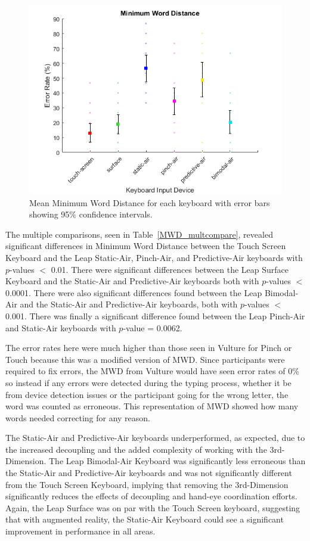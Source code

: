 \begin{figure}[h]
	\centering
	\includegraphics{fig_MWD_mean}
	\caption[Mean Minimum Word Distance]{Mean Minimum Word Distance for each keyboard with error bars showing 95\% confidence intervals.}
	\label{fig_MWD_mean}
\end{figure}

The multiple comparisons, seen in Table~\ref{MWD_multcompare}, revealed significant differences in Minimum Word Distance between the Touch Screen Keyboard and the Leap Static-Air, Pinch-Air, and Predictive-Air keyboards with $p$-values $<$ 0.01. There were significant differences between the Leap Surface Keyboard and the Static-Air and Predictive-Air keyboards both with $p$-values $<$ 0.0001. There were also significant differences found between the Leap Bimodal-Air and the Static-Air and Predictive-Air keyboards, both with $p$-values $<$ 0.001. There was finally a significant difference found between the Leap Pinch-Air and Static-Air keyboards with $p$-value = 0.0062.

The error rates here were much higher than those seen in Vulture for Pinch or Touch \cite{ref_vulture} because this was a modified version of MWD. Since participants were required to fix errors, the MWD from Vulture would have seen error rates of 0\% so instead if any errors were detected during the typing process, whether it be from device detection issues or the participant going for the wrong letter, the word was counted as erroneous. This representation of MWD showed how many words needed correcting for any reason.

The Static-Air and Predictive-Air keyboards underperformed, as expected, due to the increased decoupling and the added complexity of working with the 3rd-Dimension. The Leap Bimodal-Air Keyboard was significantly less erroneous than the Static-Air and Predictive-Air keyboards and was not significantly different from the Touch Screen Keyboard, implying that removing the 3rd-Dimension significantly reduces the effects of decoupling and hand-eye coordination efforts. Again, the Leap Surface was on par with the Touch Screen keyboard, suggesting that with augmented reality, the Static-Air Keyboard could see a significant improvement in performance in all areas.

